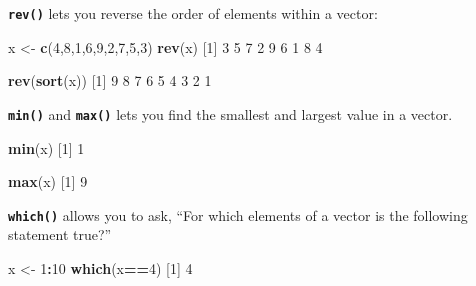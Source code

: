 \documentclass[]{book}
\newenvironment{Shaded}{\begin{snugshade}}{\end{snugshade}}
\newcommand{\DecValTok}[1]{\textcolor[rgb]{0.00,0.00,0.81}{#1}}
\newcommand{\KeywordTok}[1]{\textcolor[rgb]{0.13,0.29,0.53}{\textbf{#1}}}
\newcommand{\NormalTok}[1]{#1}
\newcommand{\OperatorTok}[1]{\textcolor[rgb]{0.81,0.36,0.00}{\textbf{#1}}}
\newcommand{\StringTok}[1]{\textcolor[rgb]{0.31,0.60,0.02}{#1}}
\begin{document}
\textbf{\texttt{rev()}} lets you reverse the order of elements within a vector:

\begin{Shaded}
\begin{Highlighting}[]
\NormalTok{x <-}\StringTok{ }\KeywordTok{c}\NormalTok{(}\DecValTok{4}\NormalTok{,}\DecValTok{8}\NormalTok{,}\DecValTok{1}\NormalTok{,}\DecValTok{6}\NormalTok{,}\DecValTok{9}\NormalTok{,}\DecValTok{2}\NormalTok{,}\DecValTok{7}\NormalTok{,}\DecValTok{5}\NormalTok{,}\DecValTok{3}\NormalTok{)}
\KeywordTok{rev}\NormalTok{(x)}
\NormalTok{[}\DecValTok{1}\NormalTok{] }\DecValTok{3} \DecValTok{5} \DecValTok{7} \DecValTok{2} \DecValTok{9} \DecValTok{6} \DecValTok{1} \DecValTok{8} \DecValTok{4}
\end{Highlighting}
\end{Shaded}

\begin{Shaded}
\begin{Highlighting}[]
\KeywordTok{rev}\NormalTok{(}\KeywordTok{sort}\NormalTok{(x))}
\NormalTok{[}\DecValTok{1}\NormalTok{] }\DecValTok{9} \DecValTok{8} \DecValTok{7} \DecValTok{6} \DecValTok{5} \DecValTok{4} \DecValTok{3} \DecValTok{2} \DecValTok{1}
\end{Highlighting}
\end{Shaded}

\textbf{\texttt{min()}} and \textbf{\texttt{max()}} lets you find the smallest and largest value in a vector.

\begin{Shaded}
\begin{Highlighting}[]
\KeywordTok{min}\NormalTok{(x)}
\NormalTok{[}\DecValTok{1}\NormalTok{] }\DecValTok{1}
\end{Highlighting}
\end{Shaded}

\begin{Shaded}
\begin{Highlighting}[]
\KeywordTok{max}\NormalTok{(x)}
\NormalTok{[}\DecValTok{1}\NormalTok{] }\DecValTok{9}
\end{Highlighting}
\end{Shaded}

\textbf{\texttt{which()}} allows you to ask, ``For which elements of a vector is the following statement true?''

\begin{Shaded}
\begin{Highlighting}[]
\NormalTok{x <-}\StringTok{ }\DecValTok{1}\OperatorTok{:}\DecValTok{10}
\KeywordTok{which}\NormalTok{(x}\OperatorTok{==}\DecValTok{4}\NormalTok{)}
\NormalTok{[}\DecValTok{1}\NormalTok{] }\DecValTok{4}
\end{Highlighting}
\end{Shaded}
\end{document}
